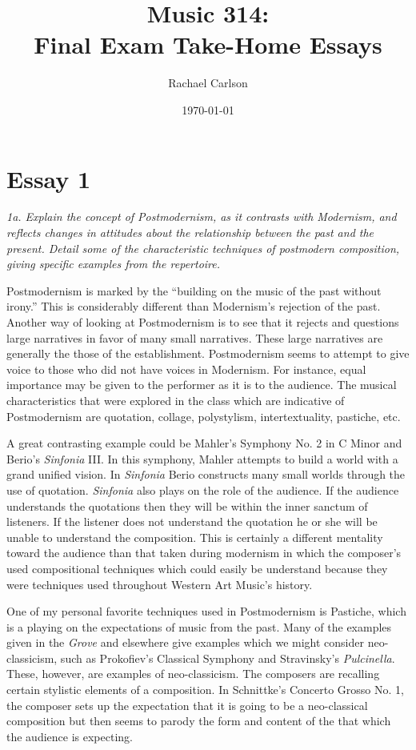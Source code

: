 \documentclass[12pt]{article}
\author{Rachael Carlson}
\title{Music 314: \\ Final Exam Take-Home Essays}
\date{\today}
\begin{document}
\maketitle

\section*{Essay 1}
\label{sec:question-1}

\emph{1a. Explain the concept of Postmodernism, as it contrasts with
  Modernism, and reflects changes in attitudes about the relationship
  between the past and the present. Detail some of the characteristic
  techniques of postmodern composition, giving specific examples from
  the repertoire.}

Postmodernism is marked by the ``building on the music of the past
without irony.''\autocite{week9} This is considerably different than
Modernism's rejection of the past. Another way of looking at
Postmodernism is to see that it rejects and questions large narratives
in favor of many small narratives. These large narratives are
generally the those of the establishment. Postmodernism seems to
attempt to give voice to those who did not have voices in
Modernism. For instance, equal importance may be given to the
performer as it is to the audience. The musical characteristics that
were explored in the class which are indicative of Postmodernism are
quotation, collage, polystylism, intertextuality, pastiche, etc.

A great contrasting example could be Mahler's Symphony No. 2 in C
Minor and Berio's \emph{Sinfonia} III. In this symphony, Mahler
attempts to build a world with a grand unified vision. In
\emph{Sinfonia} Berio constructs many small worlds through the use of
quotation. \emph{Sinfonia} also plays on the role of the audience. If
the audience understands the quotations then they will be within the
inner sanctum of listeners. If the listener does not understand the
quotation he or she will be unable to understand the composition. This
is certainly a different mentality toward the audience than that taken
during modernism in which the composer's used compositional techniques
which could easily be understand because they were techniques used
throughout Western Art Music's history.

One of my personal favorite techniques used in Postmodernism is
Pastiche, which is a playing on the expectations of music from the
past. Many of the examples given in the \emph{Grove} and elsewhere
give examples which we might consider neo-classicism, such as
Prokofiev's Classical Symphony and Stravinsky's
\emph{Pulcinella}. These, however, are examples of neo-classicism. The
composers are recalling certain stylistic elements of a
composition. In Schnittke's Concerto Grosso No. 1, the composer sets
up the expectation that it is going to be a neo-classical composition
but then seems to parody the form and content of the that which the
audience is expecting.
\end{document}
